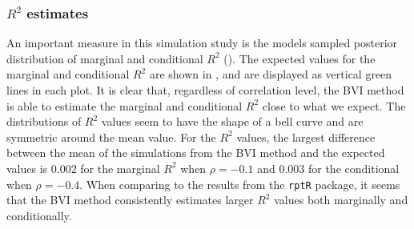 \subsubsection{$R^2$ estimates}
An important measure in this simulation study is the models sampled posterior distribution of marginal and conditional $R^2$ (). The expected values for the marginal and conditional $R^2$ are shown in , and are displayed as vertical green lines in each plot. It is clear that, regardless of correlation level, the BVI method is able to estimate the marginal and conditional $R^2$ close to what we expect. The distributions of $R^2$ values seem to have the shape of a bell curve and are symmetric around the mean value. For the $R^2$ values, the largest difference between the mean of the simulations from the BVI method and the expected values is $0.002$ for the marginal $R^2$ when $\rho=-0.1$ and $0.003$ for the conditional when $\rho=-0.4$. When comparing to the results from the \texttt{rptR} package, it seems that the BVI method consistently estimates larger $R^2$ values both marginally and conditionally. 
